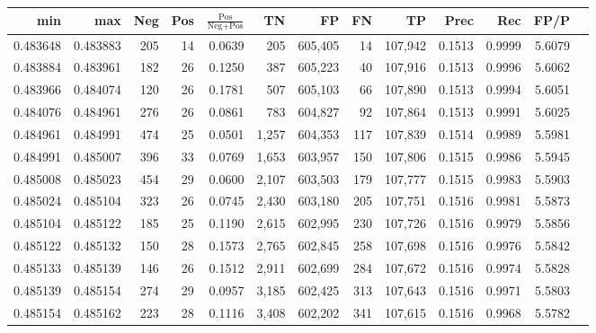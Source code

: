 \begin{tabular}{rrrrrrrrrrrrr}
\toprule
     min &      max & Neg & Pos & $\frac{\text{Pos}}{\text{Neg}+\text{Pos}}$ &      TN &      FP &      FN &      TP &   Prec &    Rec &   FP/P \\
\midrule
0.483648 & 0.483883 & 205 &  14 &                                     0.0639 &     205 & 605,405 &      14 & 107,942 & 0.1513 & 0.9999 & 5.6079 \\
0.483884 & 0.483961 & 182 &  26 &                                     0.1250 &     387 & 605,223 &      40 & 107,916 & 0.1513 & 0.9996 & 5.6062 \\
0.483966 & 0.484074 & 120 &  26 &                                     0.1781 &     507 & 605,103 &      66 & 107,890 & 0.1513 & 0.9994 & 5.6051 \\
0.484076 & 0.484961 & 276 &  26 &                                     0.0861 &     783 & 604,827 &      92 & 107,864 & 0.1513 & 0.9991 & 5.6025 \\
0.484961 & 0.484991 & 474 &  25 &                                     0.0501 &   1,257 & 604,353 &     117 & 107,839 & 0.1514 & 0.9989 & 5.5981 \\
0.484991 & 0.485007 & 396 &  33 &                                     0.0769 &   1,653 & 603,957 &     150 & 107,806 & 0.1515 & 0.9986 & 5.5945 \\
0.485008 & 0.485023 & 454 &  29 &                                     0.0600 &   2,107 & 603,503 &     179 & 107,777 & 0.1515 & 0.9983 & 5.5903 \\
0.485024 & 0.485104 & 323 &  26 &                                     0.0745 &   2,430 & 603,180 &     205 & 107,751 & 0.1516 & 0.9981 & 5.5873 \\
0.485104 & 0.485122 & 185 &  25 &                                     0.1190 &   2,615 & 602,995 &     230 & 107,726 & 0.1516 & 0.9979 & 5.5856 \\
0.485122 & 0.485132 & 150 &  28 &                                     0.1573 &   2,765 & 602,845 &     258 & 107,698 & 0.1516 & 0.9976 & 5.5842 \\
0.485133 & 0.485139 & 146 &  26 &                                     0.1512 &   2,911 & 602,699 &     284 & 107,672 & 0.1516 & 0.9974 & 5.5828 \\
0.485139 & 0.485154 & 274 &  29 &                                     0.0957 &   3,185 & 602,425 &     313 & 107,643 & 0.1516 & 0.9971 & 5.5803 \\
0.485154 & 0.485162 & 223 &  28 &                                     0.1116 &   3,408 & 602,202 &     341 & 107,615 & 0.1516 & 0.9968 & 5.5782 \\

\end{tabular}
